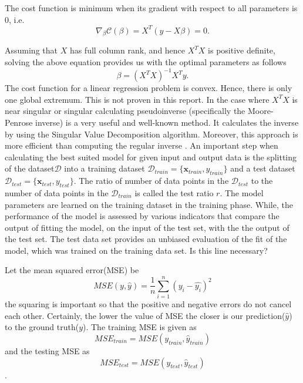 The cost function is minimum when its gradient with respect to all parameters is 0, i.e.
\begin{equation*}
    \nabla_{\beta}\mathcal{C}(\beta) = X^T(y-X\beta) = 0.
\end{equation*}

Assuming that $X$ has full column rank, and hence $X^T X$ is positive definite, solving the above equation provides us with the optimal parameters as follows
\begin{equation}
    \beta = (X^TX)^{-1}X^Ty.
\end{equation}
The cost function for a linear regression problem is convex. Hence, there is only one global extremum. This is not proven in this report.
\newline \newline
In the case where $X^T X$ is near singular or singular calculating pseudoinverse (specifically the
Moore-Penrose inverse) is a very useful and well-known method. It calculates the inverse by using the Singular Value Decomposition algorithm. Moreover, this approach is more efficient than computing the regular inverse \cite{geron_hands-machine_2019}.
\newline \newline
An important step when calculating the best suited model for given input and output data is the splitting of the dataset$\mathcal{D}$ into a training dataset $\mathcal{D}_{train} = \{\boldsymbol{x}_{train}, y_{train}\}$ and a test dataset $\mathcal{D}_{test} = \{\boldsymbol{x}_{test}, y_{test}\}$. The ratio of number of data points in the $\mathcal{D}_{test}$ to the number of data points in the $\mathcal{D}_{train}$ is called the test ratio $r$. The model parameters are learned on the training dataset in the training phase. While, the performance of the model is assessed by various indicators that compare the output of fitting the model, on the input of the test set, with the the output of the test set. {\color{red}The test data set provides an unbiased evaluation of the fit of the model, which was trained on the training data set. Is this line necessary?} \newline

Let the mean squared error(MSE) be 
\begin{equation}
    MSE(y, \hat{y}) = \frac{1}{n}\sum_{i=1}^{n}(y_i - \hat{y_i})^2
\end{equation}
the squaring is important so that the positive and negative errors do not cancel each other. Certainly, the lower the value of MSE the closer is our prediction($\hat{y}$) to the ground truth($y$). The training MSE is given as $$MSE_{train} = MSE(y_{train}, \hat{y}_{train})$$ and the testing MSE as $$MSE_{test} = MSE(y_{test}, \hat{y}_{test})$$. 

